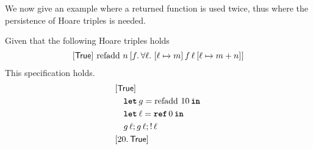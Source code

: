 \documentclass[thesis.tex]{subfiles}
\begin{document}
We now give an example where a returned function is used twice, thus where the persistence of Hoare triples is needed.
\begin{lemma}{}{}
    Given that the following Hoare triples holds $$\hoare{\TRUE}{\operatorname{refadd}\, n}{\Ret f. {\forall \loc.\ \hoare{\loc \fmapsto m}{f\, \loc}{\loc\fmapsto m + n}}}$$
    This specification holds.
    \[
        \begin{aligned}
             & \rightbracket{\TRUE}                         \\
             & \quad \Let g = \operatorname{refadd}\, 10 in \\
             & \quad \Let \loc = \Alloc 0 in                \\
             & \quad g\, \loc; g\, \loc; \deref \loc        \\
             & \rightbracket{\Ret 20. \TRUE}
        \end{aligned}
    \]
\end{lemma}
\end{document}
